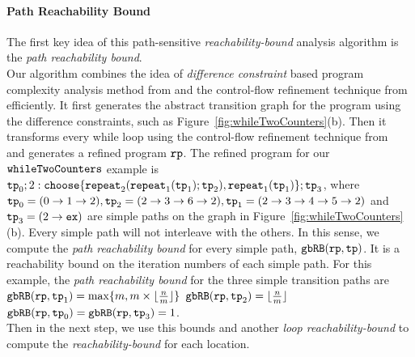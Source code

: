 \paragraph{Path Reachability Bound}
The first key idea of this path-sensitive \emph{reachability-bound} analysis algorithm is the \emph{path reachability bound}.
\\
Our algorithm combines the idea of \emph{difference constraint} based program complexity analysis method from \cite{sinn2017complexity}
and the control-flow refinement technique from~\cite{GulwaniJK09} efficiently.
It first
generates the abstract transition graph for the program using the difference constraints, such as Figure~\ref{fig:whileTwoCounters}(b).
Then it transforms every while loop using the control-flow refinement technique from~\cite{GulwaniJK09} and generates a refined program ${\mathtt{rp}}$.
% 
The refined program for our ${\mathtt{whileTwoCounters}}$ example is
$
  \tpath_0 ; 
  2: \rpchoose{\rprepeat_2(\rprepeat_1(\tpath_1); \tpath_2) , 
  \rprepeat_1(\tpath_1) }; \tpath_3
$, where ${\mathtt{tp}}_0 = (0 \to 1 \to 2), {\mathtt{tp}}_2 = (2 \to 3 \to 6 \to 2), {\mathtt{tp}}_1 = (2 \to 3 \to 4 \to 5 \to 2)$
and ${\mathtt{tp}}_3 = (2 \to {\mathtt{ex}})$ are simple paths on the graph in Figure~\ref{fig:whileTwoCounters}(b).
Every simple path will not interleave with the others. 
In this sense, we compute the \emph{path reachability bound} for every simple path,
${\mathtt{gbRB}}({\mathtt{rp}}, {\mathtt{tp}})$.
It is a reachability bound on the iteration numbers of each simple path.
For this example, the \emph{path reachability bound} for the three simple transition paths are
${\mathtt{gbRB}}({\mathtt{rp}}, {\mathtt{tp}}_1) = \max\{m, m \times \lfloor\frac{n}{m}\rfloor\}$ \quad
${\mathtt{gbRB}}({\mathtt{rp}}, {\mathtt{tp}}_2) = \lfloor\frac{n}{m}\rfloor$ \quad
${\mathtt{gbRB}}({\mathtt{rp}}, {\mathtt{tp}}_0) = {\mathtt{gbRB}}({\mathtt{rp}}, {\mathtt{tp}}_3) = 1$.
\\
Then in the next step, we use this bounds
and another \emph{loop reachability-bound}
to compute the \emph{reachability-bound} for each location.
%
